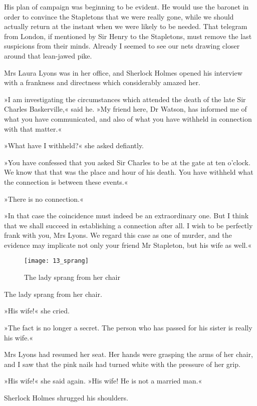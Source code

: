 His plan of campaign was beginning to be evident. He would use the baronet in order to convince the Stapletons that we were really gone, while we should actually return at the instant when we were likely to be needed. That telegram from London, if mentioned by Sir Henry to the Stapletons, must remove the last suspicions from their minds. Already I seemed to see our nets drawing closer around that lean-jawed pike.

Mrs Laura Lyons was in her office, and Sherlock Holmes opened his interview with a frankness and directness which considerably amazed her.

»I am investigating the circumstances which attended the death of the late Sir Charles Baskerville,« said he. »My friend here, Dr Watson, has informed me of what you have communicated, and also of what you have withheld in connection with that matter.«

»What have I withheld?« she asked defiantly.

»You have confessed that you asked Sir Charles to be at the gate at ten o'clock. We know that that was the place and hour of his death. You have withheld what the connection is between these events.«

»There is no connection.«

»In that case the coincidence must indeed be an extraordinary one. But I think that we shall succeed in establishing a connection after all. I wish to be perfectly frank with you, Mrs Lyons. We regard this case as one of murder, and the evidence may implicate not only your friend Mr Stapleton, but his wife as well.«

\begin{figure}[tbh]
\centering
\texttt{[image: 13\_sprang]}
\caption{The lady sprang from her chair}
\end{figure}

The lady sprang from her chair.

»His wife!« she cried.

»The fact is no longer a secret. The person who has passed for his sister is really his wife.«

Mrs Lyons had resumed her seat. Her hands were grasping the arms of her chair, and I saw that the pink nails had turned white with the pressure of her grip.

»His wife!« she said again. »His wife! He is not a married man.«

Sherlock Holmes shrugged his shoulders.

